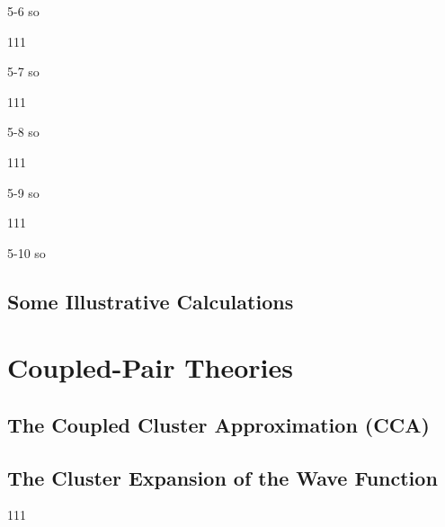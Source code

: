 \documentclass[a4paper]{book}
\begin{document}
	\begin{solution}
		5-6 so
	\end{solution}
	
	\begin{exercise}
	111
	\end{exercise}
	
	\begin{solution}
		5-7 so
	\end{solution}
	
	\begin{exercise}
	111
	\end{exercise}
	
	\begin{solution}
		5-8 so
	\end{solution}
	
	\begin{exercise}
	111
	\end{exercise}
	
	\begin{solution}
		5-9 so
	\end{solution}
	
	\begin{exercise}
	111
	\end{exercise}
	
	\begin{solution}
		5-10 so
	\end{solution}
	
	\subsection{Some Illustrative Calculations}
	
	\section{Coupled-Pair Theories}
	
	\subsection{The Coupled Cluster Approximation (CCA)}
	
	\subsection{The Cluster Expansion of the Wave Function}
	
	\begin{exercise}
	111
	\end{exercise}
	
\end{document}
